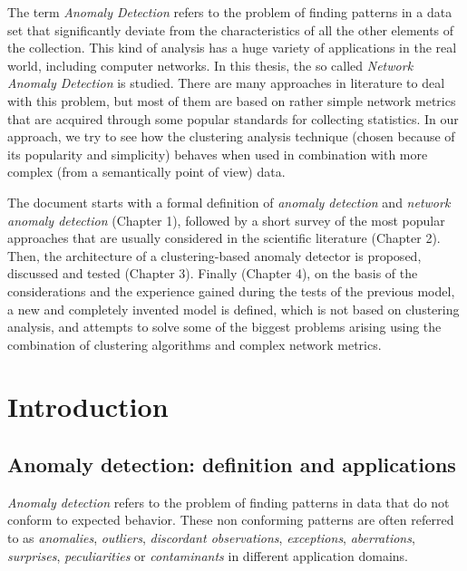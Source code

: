 \documentclass[12pt,a4paper,cucitura]{toptesi}
\newcommand*\paginabianca{\clearpage\null\clearpage}
\begin{document}
\normalem

\frontespizio

\english

\sommario

The term \emph{Anomaly Detection} refers to the problem of finding patterns in a data set that significantly deviate from the characteristics of 
all the other elements of the collection.
This kind of analysis has a huge variety of applications in the real world, including computer networks.
In this thesis, the so called \emph{Network Anomaly Detection} is studied.
There are many approaches in literature to deal with this problem, but most of them are based on rather simple network metrics that are acquired through some popular standards for collecting statistics.
In our approach, we try to see how the clustering analysis technique (chosen because of its popularity and simplicity) behaves when used in combination with more complex (from a semantically point of view) data.

The document starts with a formal definition of \emph{anomaly detection} and \emph{network anomaly detection} (Chapter 1), followed by a short survey of the most popular approaches that are usually considered in the scientific literature (Chapter 2).
Then, the architecture of a clustering-based anomaly detector is proposed, discussed and tested (Chapter 3).
Finally (Chapter 4), on the basis of the considerations and the experience gained during the tests of the previous model, a new and completely invented  model is defined, which is not based on clustering analysis, and attempts to solve some of the biggest problems arising using the combination of clustering algorithms and complex network metrics.

\paginabianca

\indici

\listoffigures
\listoftables
\lstlistoflistings

\chapter{Introduction}
\section{Anomaly detection: definition and applications}

\emph{Anomaly detection} refers to the problem of finding patterns in data that do not conform to expected behavior.
These non conforming patterns are often referred to as \emph{anomalies}, \emph{outliers}, \emph{discordant observations}, \emph{exceptions}, \emph{aberrations}, \emph{surprises}, \emph{peculiarities} or \emph{contaminants} in different application domains.
\end{document}
